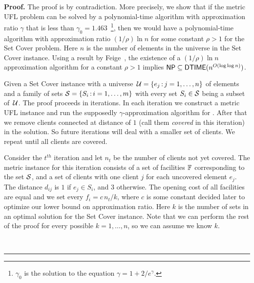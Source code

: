 \documentclass[oneside,final]{ucr}
\newenvironment{proof}[1][Proof]{\textbf{#1.} }{\ \rule{0.5em}{0.5em}}
\begin{document}
\begin{proof}
  The proof is by contradiction. More precisely, we show
  that if the metric UFL problem can be solved by a
  polynomial-time algorithm with approximation ratio
  $\gamma$ that is less than $\gamma_0 =
  1.463$~\footnote{$\gamma_0$ is the solution to the
    equation $\gamma = 1 + 2/e^\gamma$.}, then we would have
  a polynomial-time algorithm with approximation ratio
  $(1/\rho) \ln n$ for some constant $\rho > 1$ for the Set
  Cover problem. Here $n$ is the number of elements in the
  universe in the Set Cover instance. Using a result by
  Feige~\cite{Feige98}, the existence of a $(1/\rho) \ln n$
  approximation algorithm for a constant $\rho > 1$ implies
  ${\mbox{\sf NP}} \subseteq {\mbox{\sf DTIME}}(n^{O(\log\log n)})$.

  Given a Set Cover instance with a universe $\,\calU =
  \{e_j \suchthat j=1,\ldots, n\}$ of elements and a family
  of sets $\calS = \{S_i\suchthat i=1,\ldots,m\}$ with every
  set $S_i \in \calS$ being a subset of $\,\calU$. The proof
  proceeds in iterations. In each iteration we construct a
  metric UFL instance and run the supposedly
  $\gamma$-approximation algorithm for {\UFL}. After that we
  remove clients connected at distance of $1$ (call them
  \emph{covered} in this iteration) in the {\UFL}
  solution. So future iterations will deal with a smaller
  set of clients. We repeat until all clients are covered.

  Consider the $t^{th}$ iteration and let $n_t$ be the
  number of clients not yet covered. The metric {\UFL}
  instance for this iteration consists of a set of
  facilities $\mathbb{F}$ corresponding to the set $\calS$,
  and a set of clients with one client $j$ for each
  uncovered element $e_j$. The distance $d_{ij}$ is $1$ if
  $e_j \in S_i$, and $3$ otherwise. The opening cost of all
  facilities are equal and we set every $f_i = c\,n_t / k$,
  where $c$ is some constant decided later to optimize our
  lower bound on approximation ratio. Here $k$ is the number
  of sets in an optimal solution for the Set Cover instance.
  Note that we can perform the rest of the proof for every
  possible $k=1,\ldots,n$, so we can assume we know $k$.


\end{proof}
\end{document}

